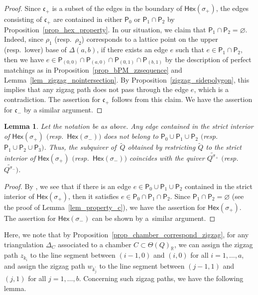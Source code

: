 \documentclass[10pt,a4paper]{amsart}
\numberwithin{equation}{section}
\newtheorem{Lemma}[Theorem]{Lemma}
\theoremstyle{definition}
\newcommand{\RR}{\mathbb{R}}
\newcommand{\fkc}{\mathfrak{c}}
\newcommand{\sfP}{\mathsf{P}}
\newcommand{\Hex}{\mathsf{Hex}}
\begin{document}
\begin{proof}
Since $\fkc_+$ is a subset of the edges in the boundary of $\Hex(\sigma_+)$, the edges consisting of $\fkc_+$ are contained in
either $\sfP_0$ or $\sfP_{1}\cap\sfP_{2}$ by Proposition~\ref{prop_hex_property}.
In our situation, we claim that $\sfP_{1}\cap\sfP_{2}=\varnothing$.
Indeed, since $\rho_1$ (resp.\ $\rho_2$) corresponds to a lattice point on the upper (resp.\ lower) base of $\Delta(a,b)$,
if there exists an edge $e$ such that $e\in\sfP_1\cap\sfP_2$,
then we have $e\in\sfP_{(0,0)}\cap\sfP_{(a,0)}\cap\sfP_{(0,1)}\cap\sfP_{(b,1)}$
by the description of perfect matchings as in Proposition~\ref{prop_bPM_zzsequence} and Lemma~\ref{lem_zigzag_nointersection}.
By Proposition~\ref{zigzag_sidepolygon}, this implies that any zigzag path does not pass through the edge $e$, which is a contradiction.
The assertion for $\fkc_+$ follows from this claim. We have the assertion for $\fkc_-$ by a similar argument.
\end{proof}

\begin{Lemma}
\label{lem_property_interior}
Let the notation be as above.
Any edge contained in the strict interior of $\Hex(\sigma_+)$ $($resp.\ $\Hex(\sigma_-))$ does not belong to $\sfP_0\cup \sfP_1\cup \sfP_2$
$($resp.\ $\sfP_1\cup \sfP_2\cup \sfP_3)$.
Thus, the subquiver of~$\widetilde{Q}$ obtained by restricting $\widetilde{Q}$ to the strict interior of $\Hex(\sigma_+)$ $($resp.\ $\Hex(\sigma_-))$
coincides with the quiver $\widetilde{Q^{\sigma_+}}$ $($resp.\ $\widetilde{Q^{\sigma_-}})$.
\end{Lemma}

\begin{proof}
By \cite[Corollary~4.18]{Moz}, we see that if there is an edge $e\in \sfP_0\cup \sfP_1\cup \sfP_2$ contained in the strict interior of $\Hex(\sigma_+)$,
then it satisfies $e\in \sfP_0\cap \sfP_1\cap \sfP_2$.
Since $\sfP_1\cap\sfP_2=\varnothing$ (see the proof of Lemma~\ref{lem_property_c}), we have the assertion for $\Hex(\sigma_+)$.
The assertion for $\Hex(\sigma_-)$ can be shown by a~similar argument.
\end{proof}

Here, we note that by Proposition~\ref{prop_chamber_correspond_zigzag},
for any triangulation $\Delta_C$ associated to a chamber $C\subset \Theta(Q)_\RR$,
we can assign the zigzag path $z_{k_i}$ to the line segment between $(i-1, 0)$ and $(i,0)$ for all $i=1, \dots, a$,
and assign the zigzag path $w_{k^\prime_j}$ to the line segment between $(j-1, 1)$ and $(j,1)$ for all $j=1, \dots, b$.
Concerning such zigzag paths, we have the following lemma.
\end{document}
